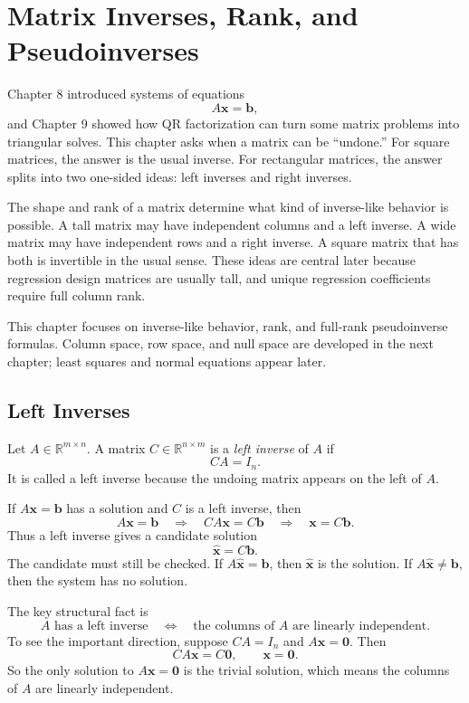 \chapter{Matrix Inverses, Rank, and Pseudoinverses}
\label{mf:ch10-matrix-inverses-rank-pseudoinverses}

Chapter 8 introduced systems of equations
\[
    A\mathbf{x}=\mathbf{b},
\]
and Chapter 9 showed how QR factorization can turn some matrix problems into triangular solves. This chapter asks when a matrix can be ``undone.'' For square matrices, the answer is the usual inverse. For rectangular matrices, the answer splits into two one-sided ideas: left inverses and right inverses.

The shape and rank of a matrix determine what kind of inverse-like behavior is possible. A tall matrix may have independent columns and a left inverse. A wide matrix may have independent rows and a right inverse. A square matrix that has both is invertible in the usual sense. These ideas are central later because regression design matrices are usually tall, and unique regression coefficients require full column rank.

This chapter focuses on inverse-like behavior, rank, and full-rank pseudoinverse formulas. Column space, row space, and null space are developed in the next chapter; least squares and normal equations appear later.

\section{Left Inverses}
\label{mf:left-inverse}

Let \(A\in\mathbb{R}^{m\times n}\). A matrix \(C\in\mathbb{R}^{n\times m}\) is a \emph{left inverse} of \(A\) if
\[
    CA=I_n.
\]
It is called a left inverse because the undoing matrix appears on the left of \(A\).

If \(A\mathbf{x}=\mathbf{b}\) has a solution and \(C\) is a left inverse, then
\[
    A\mathbf{x}=\mathbf{b}
    \quad\Longrightarrow\quad
    CA\mathbf{x}=C\mathbf{b}
    \quad\Longrightarrow\quad
    \mathbf{x}=C\mathbf{b}.
\]
Thus a left inverse gives a candidate solution
\[
    \widehat{\mathbf{x}}=C\mathbf{b}.
\]
The candidate must still be checked. If \(A\widehat{\mathbf{x}}=\mathbf{b}\), then \(\widehat{\mathbf{x}}\) is the solution. If \(A\widehat{\mathbf{x}}\neq\mathbf{b}\), then the system has no solution.

The key structural fact is
\[
    A \text{ has a left inverse}
    \quad\Longleftrightarrow\quad
    \text{the columns of } A \text{ are linearly independent.}
\]
To see the important direction, suppose \(CA=I_n\) and \(A\mathbf{x}=\mathbf{0}\). Then
\[
    CA\mathbf{x}=C\mathbf{0},
    \qquad
    \mathbf{x}=\mathbf{0}.
\]
So the only solution to \(A\mathbf{x}=\mathbf{0}\) is the trivial solution, which means the columns of \(A\) are linearly independent.

